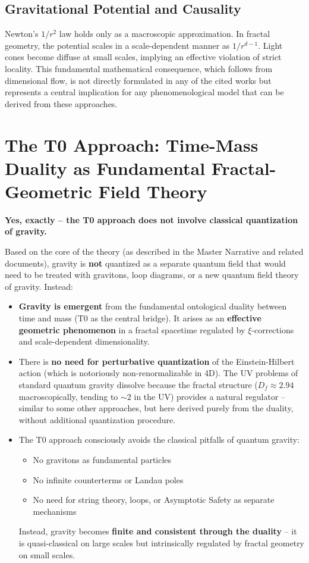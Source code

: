 	\subsection{Gravitational Potential and Causality}
	Newton's $1/r^2$ law holds only as a macroscopic approximation. In fractal geometry, the potential scales in a scale-dependent manner as $1/r^{d-1}$. Light cones become diffuse at small scales, implying an effective violation of strict locality. This fundamental mathematical consequence, which follows from dimensional flow, is not directly formulated in any of the cited works but represents a central implication for any phenomenological model that can be derived from these approaches.
	
	\section{The T0 Approach: Time-Mass Duality as Fundamental Fractal-Geometric Field Theory}
	
	\textbf{Yes, exactly – the T0 approach does not involve classical quantization of gravity.}
	
	Based on the core of the theory (as described in the Master Narrative and related documents), gravity is \textbf{not} quantized as a separate quantum field that would need to be treated with gravitons, loop diagrams, or a new quantum field theory of gravity. Instead:
	
	\begin{itemize}
		\item \textbf{Gravity is emergent} from the fundamental ontological duality between time and mass (T0 as the central bridge). It arises as an \textbf{effective geometric phenomenon} in a fractal spacetime regulated by $\xi$-corrections and scale-dependent dimensionality.
		
		\item There is \textbf{no need for perturbative quantization} of the Einstein-Hilbert action (which is notoriously non-renormalizable in 4D). The UV problems of standard quantum gravity dissolve because the fractal structure ($D_f \approx 2.94$ macroscopically, tending to $\sim 2$ in the UV) provides a natural regulator – similar to some other approaches, but here derived purely from the duality, without additional quantization procedure.
		
		\item The T0 approach consciously avoids the classical pitfalls of quantum gravity:
		\begin{itemize}
			\item No gravitons as fundamental particles
			\item No infinite counterterms or Landau poles
			\item No need for string theory, loops, or Asymptotic Safety as separate mechanisms
		\end{itemize}
		Instead, gravity becomes \textbf{finite and consistent through the duality} – it is quasi-classical on large scales but intrinsically regulated by fractal geometry on small scales.
	\end{itemize}
	
